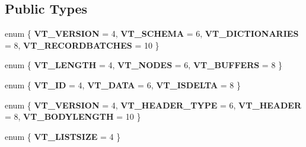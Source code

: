 \subsection*{Public Types}
\begin{DoxyCompactItemize}
\item 
enum \{ {\bfseries V\+T\+\_\+\+V\+E\+R\+S\+I\+ON} = 4, 
{\bfseries V\+T\+\_\+\+S\+C\+H\+E\+MA} = 6, 
{\bfseries V\+T\+\_\+\+D\+I\+C\+T\+I\+O\+N\+A\+R\+I\+ES} = 8, 
{\bfseries V\+T\+\_\+\+R\+E\+C\+O\+R\+D\+B\+A\+T\+C\+H\+ES} = 10
 \}\hypertarget{structorg_1_1apache_1_1arrow_1_1flatbuf_1_1FLATBUFFERS__FINAL__CLASS_ad0ffaac013eacf67047fdb45a5523e73}{}\label{structorg_1_1apache_1_1arrow_1_1flatbuf_1_1FLATBUFFERS__FINAL__CLASS_ad0ffaac013eacf67047fdb45a5523e73}

\item 
enum \{ {\bfseries V\+T\+\_\+\+L\+E\+N\+G\+TH} = 4, 
{\bfseries V\+T\+\_\+\+N\+O\+D\+ES} = 6, 
{\bfseries V\+T\+\_\+\+B\+U\+F\+F\+E\+RS} = 8
 \}\hypertarget{structorg_1_1apache_1_1arrow_1_1flatbuf_1_1FLATBUFFERS__FINAL__CLASS_aea1c84f92596dc976e996d77b6bdad68}{}\label{structorg_1_1apache_1_1arrow_1_1flatbuf_1_1FLATBUFFERS__FINAL__CLASS_aea1c84f92596dc976e996d77b6bdad68}

\item 
enum \{ {\bfseries V\+T\+\_\+\+ID} = 4, 
{\bfseries V\+T\+\_\+\+D\+A\+TA} = 6, 
{\bfseries V\+T\+\_\+\+I\+S\+D\+E\+L\+TA} = 8
 \}\hypertarget{structorg_1_1apache_1_1arrow_1_1flatbuf_1_1FLATBUFFERS__FINAL__CLASS_a266e269c197dc614e996945e940bd80d}{}\label{structorg_1_1apache_1_1arrow_1_1flatbuf_1_1FLATBUFFERS__FINAL__CLASS_a266e269c197dc614e996945e940bd80d}

\item 
enum \{ {\bfseries V\+T\+\_\+\+V\+E\+R\+S\+I\+ON} = 4, 
{\bfseries V\+T\+\_\+\+H\+E\+A\+D\+E\+R\+\_\+\+T\+Y\+PE} = 6, 
{\bfseries V\+T\+\_\+\+H\+E\+A\+D\+ER} = 8, 
{\bfseries V\+T\+\_\+\+B\+O\+D\+Y\+L\+E\+N\+G\+TH} = 10
 \}\hypertarget{structorg_1_1apache_1_1arrow_1_1flatbuf_1_1FLATBUFFERS__FINAL__CLASS_a0da49fe54670285637586fe618e7f76f}{}\label{structorg_1_1apache_1_1arrow_1_1flatbuf_1_1FLATBUFFERS__FINAL__CLASS_a0da49fe54670285637586fe618e7f76f}

\item 
enum \{ {\bfseries V\+T\+\_\+\+L\+I\+S\+T\+S\+I\+ZE} = 4
 \}\hypertarget{structorg_1_1apache_1_1arrow_1_1flatbuf_1_1FLATBUFFERS__FINAL__CLASS_a4e64347a73734d798d6955ee96205424}{}\label{structorg_1_1apache_1_1arrow_1_1flatbuf_1_1FLATBUFFERS__FINAL__CLASS_a4e64347a73734d798d6955ee96205424}


\end{DoxyCompactItemize}
